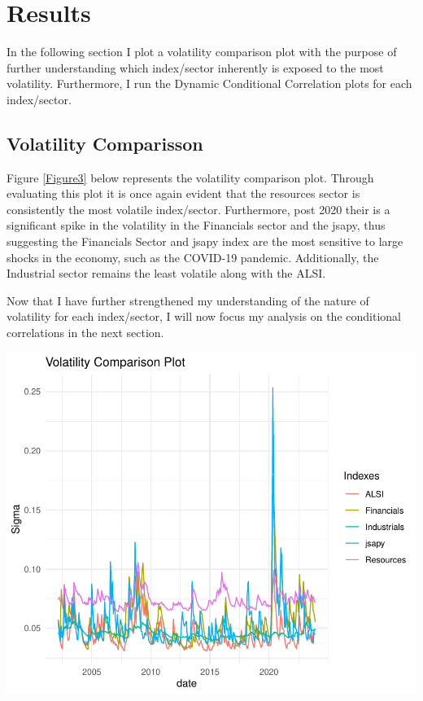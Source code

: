 \documentclass[12pt,preprint, authoryear]{elsarticle}
\let\origfigure\figure
\let\endorigfigure\endfigure
\renewenvironment{figure}[1][2] {
    \expandafter\origfigure\expandafter[H]
} {
    \endorigfigure
}
\numberwithin{equation}{section}
\numberwithin{figure}{section}
\numberwithin{table}{section}
\begin{document}
\hypertarget{results}{%
\section{\texorpdfstring{Results
\label{Results}}{Results }}\label{results}}

In the following section I plot a volatility comparison plot with the
purpose of further understanding which index/sector inherently is
exposed to the most volatility. Furthermore, I run the Dynamic
Conditional Correlation plots for each index/sector.

\hypertarget{volatility-comparisson}{%
\subsection{Volatility Comparisson}\label{volatility-comparisson}}

Figure \ref{Figure3} below represents the volatility comparison plot.
Through evaluating this plot it is once again evident that the resources
sector is consistently the most volatile index/sector. Furthermore, post
2020 their is a significant spike in the volatility in the Financials
sector and the jsapy, thus suggesting the Financials Sector and jsapy
index are the most sensitive to large shocks in the economy, such as the
COVID-19 pandemic. Additionally, the Industrial sector remains the least
volatile along with the ALSI.

Now that I have further strengthened my understanding of the nature of
volatility for each index/sector, I will now focus my analysis on the
conditional correlations in the next section.

\begin{figure}[H]

{\centering \includegraphics{DCC_GARCH_22582053_files/figure-latex/Figure3-1} 

}

\caption{Volatility comparisson plot \label{Figure3}}\label{fig:Figure3}
\end{figure}
\end{document}
